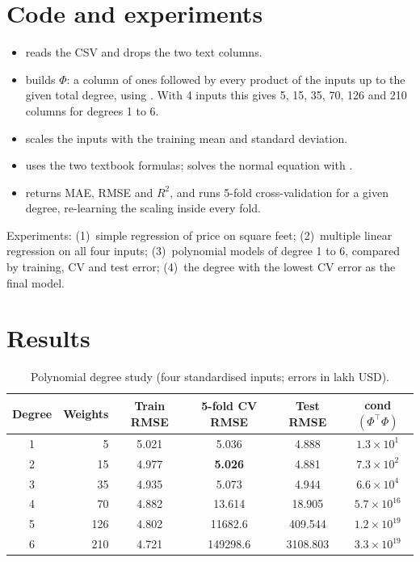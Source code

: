 \section{Code and experiments}
\begin{itemize}
\item {} reads the CSV and drops the two text columns.
\item {} builds $\Phi$: a column of ones followed by every product of
      the inputs up to the given total degree, using .
      With 4 inputs this gives 5, 15, 35, 70, 126 and 210 columns for degrees 1 to 6.
\item {} scales the inputs with the training mean and standard deviation.
\item {} uses the two textbook formulas;  solves the normal
      equation with .
\item {} returns MAE, RMSE and $R^2$, and  runs 5-fold
      cross-validation for a given degree, re-learning the scaling inside every fold.
\end{itemize}
\noindent Experiments: (1)~simple regression of price on square feet; (2)~multiple linear regression on
all four inputs; (3)~polynomial models of degree 1 to 6, compared by training, CV and test error;
(4)~the degree with the lowest CV error as the final model.

\section{Results}

\begin{table}[H]
\centering\small
\caption{Polynomial degree study (four standardised inputs; errors in lakh USD).}
\label{tab:lr-degree}
\begin{tabular}{@{}c r S[table-format=1.3] S[table-format=6.1] S[table-format=4.3] c@{}}
\toprule
\textbf{Degree} & \textbf{Weights} & {\textbf{Train RMSE}} & {\textbf{5-fold CV RMSE}} & {\textbf{Test RMSE}} & \textbf{cond$(\Phi^\top\Phi)$}\\
 & 5   & 5.021 & 5.036 & 4.888 & $1.3\times10^{1}$\\
2 & 15  & 4.977 & \bfseries 5.026 & 4.881 & $7.3\times10^{2}$\\
3 & 35  & 4.935 & 5.073 & 4.944 & $6.6\times10^{4}$\\
4 & 70  & 4.882 & 13.614 & 18.905 & $5.7\times10^{16}$\\
5 & 126 & 4.802 & 11682.6 & 409.544 & $1.2\times10^{19}$\\
6 & 210 & 4.721 & 149298.6 & 3108.803 & $3.3\times10^{19}$\\
\bottomrule
\end{tabular}
\end{table}

